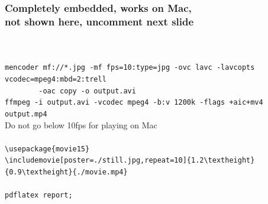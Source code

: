 \documentclass{beamer}
\begin{document}
\bgroup
{}
\egroup

\begin{frame}[fragile]
  \frametitle{Completely embedded, works on Mac,\\ not shown here, uncomment next slide}
  \\[0.3cm]
  \\[0.1cm]
  {\tiny
    \hspace*{1cm}\verb|mencoder mf://*.jpg -mf fps=10:type=jpg -ovc lavc -lavcopts vcodec=mpeg4:mbd=2:trell|\\
    \hspace*{1cm}\verb|        -oac copy -o output.avi|\\[0.1cm]
    \hspace*{1cm}\verb|ffmpeg -i output.avi -vcodec mpeg4 -b:v 1200k -flags +aic+mv4 output.mp4|\\[0.1cm]
    \hspace*{1cm}Do not go below 10fps for playing on Mac\\[0.3cm]
  }
  \\[0.1cm]
  {\tiny
    \hspace*{1cm}\verb|\usepackage{movie15}|\\[0.1cm]
    \hspace*{1cm}\verb|\includemovie[poster=./still.jpg,repeat=10]{1.2\textheight}{0.9\textheight}{./movie.mp4}|\\[0.3cm]
  }
  \\[0.1cm]
  {\tiny
    \hspace*{1cm}\verb|pdflatex report;|\\[0.3cm]
  }
\end{frame}
\end{document}
